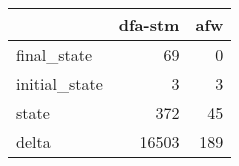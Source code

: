 \begin{tabular}{lrr}
\toprule
{} &  dfa-stm &  afw \\
\midrule
final\_state   &       69 &    0 \\
initial\_state &        3 &    3 \\
state         &      372 &   45 \\
delta         &    16503 &  189 \\
\bottomrule
\end{tabular}

